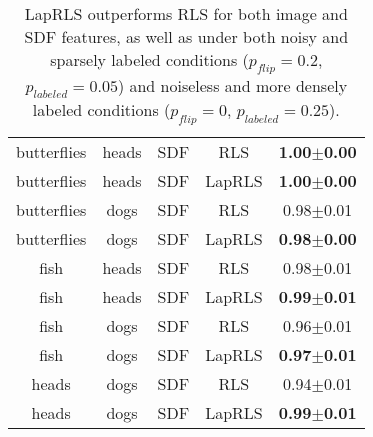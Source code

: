 \documentclass[anon,11pt]{9520} %
\begin{document}
\begin{table}[h!]
\begin{center}
\begin{tabular}{|c|c|c|c|c|}
butterflies&	heads&	SDF&		RLS&			\textbf{1.00$\pm$0.00}\\
butterflies&	heads&	SDF&		LapRLS&			\textbf{1.00$\pm$0.00}\\\hline

butterflies&	dogs&	SDF&		RLS&			0.98$\pm$0.01\\
butterflies&	dogs&	SDF&		LapRLS&			\textbf{0.98$\pm$0.00}\\\hline

fish&	heads&	SDF&		RLS&			0.98$\pm$0.01\\
fish&	heads&	SDF&		LapRLS&			\textbf{0.99$\pm$0.01}\\\hline

fish&	dogs&	SDF&		RLS&			0.96$\pm$0.01\\
fish&	dogs&	SDF&		LapRLS&			\textbf{0.97$\pm$0.01}\\\hline

heads&	dogs&	SDF&		RLS&			0.94$\pm$0.01\\
heads&	dogs&	SDF&		LapRLS&			\textbf{0.99$\pm$0.01}\\\hline
\end{tabular}
\end{center}
\caption{\label{tbl:rls_laprls} LapRLS outperforms RLS for both image and SDF
  features, as well as under both noisy and sparsely labeled conditions
  ($p_{flip} = 0.2$, $p_{labeled} = 0.05$) and noiseless and more densely
  labeled conditions ($p_{flip} = 0$, $p_{labeled} = 0.25$).}
\end{table}

\end{document}
